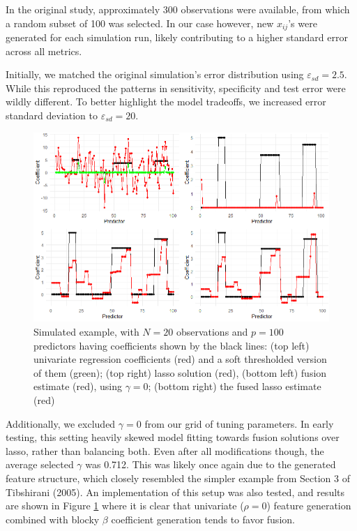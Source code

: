 \documentclass[12pt]{article}
\begin{document}
In the original study, approximately 300 observations were available, from which a random subset of 100 was selected. In our case however, new $x_{ij}$'s were generated for each simulation run, likely contributing to a higher standard error across all metrics.

Initially, we matched the original simulation's error distribution using $\varepsilon_{sd} = 2.5$. While this reproduced the patterns in sensitivity, specificity and test error were wildly different. To better highlight the model tradeoffs, we increased error standard deviation to $\varepsilon_{sd} = 20$.

\begin{figure}[H]
    \centering
    \includegraphics[width = 1\linewidth]{sim-3.png}
    \caption{\footnotesize Simulated example, with $N = 20$ observations and $p = 100$ predictors having coefficients shown by the black lines: (top left) univariate regression coefficients (red) and a soft thresholded version of them (green); (top right) lasso solution (red), (bottom left) fusion estimate (red), using $\gamma = 0$; (bottom right) the fused lasso estimate (red)}
    \label{fig:Tib-3}
\end{figure}

Additionally, we excluded $\gamma = 0$ from our grid of tuning parameters. In early testing, this setting heavily skewed model fitting towards fusion solutions over lasso, rather than balancing both. Even after all modifications though, the average selected $\gamma$ was 0.712. This was likely once again due to the generated feature structure, which closely resembled the simpler example from Section 3 of Tibshirani (2005). An implementation of this setup was also tested, and results are shown in Figure \ref{fig:Tib-3} where it is clear that univariate ($\rho = 0$) feature generation combined with blocky $\beta$ coefficient generation tends to favor fusion. 
\end{document}
